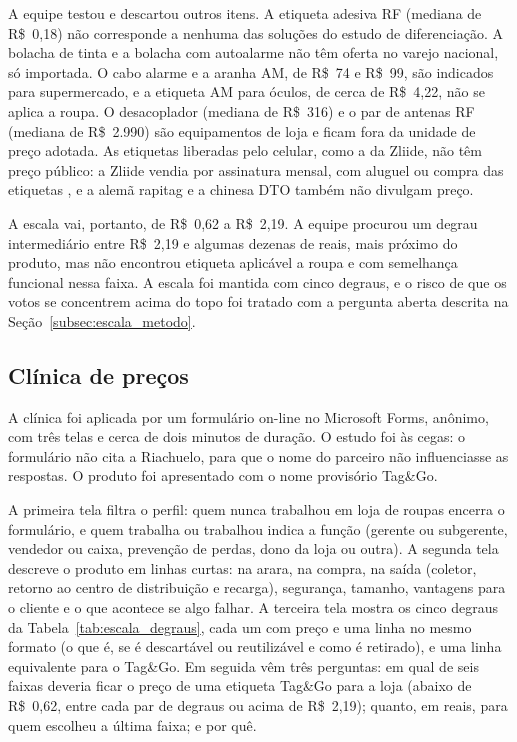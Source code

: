 A equipe testou e descartou outros itens. A etiqueta adesiva RF (mediana de R\$~0,18) não corresponde a nenhuma das soluções do estudo de diferenciação. A bolacha de tinta e a bolacha com autoalarme não têm oferta no varejo nacional, só importada. O cabo alarme e a aranha AM, de R\$~74 e R\$~99, são indicados para supermercado, e a etiqueta AM para óculos, de cerca de R\$~4,22, não se aplica a roupa. O desacoplador (mediana de R\$~316) e o par de antenas RF (mediana de R\$~2.990) são equipamentos de loja e ficam fora da unidade de preço adotada. As etiquetas liberadas pelo celular, como a da Zliide, não têm preço público: a Zliide vendia por assinatura mensal, com aluguel ou compra das etiquetas \cite{swedberg2021}, e a alemã rapitag e a chinesa DTO também não divulgam preço.

A escala vai, portanto, de R\$~0,62 a R\$~2,19. A equipe procurou um degrau intermediário entre R\$~2,19 e algumas dezenas de reais, mais próximo do produto, mas não encontrou etiqueta aplicável a roupa e com semelhança funcional nessa faixa. A escala foi mantida com cinco degraus, e o risco de que os votos se concentrem acima do topo foi tratado com a pergunta aberta descrita na Seção~\ref{subsec:escala_metodo}.

\subsection{Clínica de preços}
\label{subsec:escala_clinica}

A clínica foi aplicada por um formulário on-line no Microsoft Forms, anônimo, com três telas e cerca de dois minutos de duração. O estudo foi às cegas: o formulário não cita a Riachuelo, para que o nome do parceiro não influenciasse as respostas. O produto foi apresentado com o nome provisório Tag\&Go.

A primeira tela filtra o perfil: quem nunca trabalhou em loja de roupas encerra o formulário, e quem trabalha ou trabalhou indica a função (gerente ou subgerente, vendedor ou caixa, prevenção de perdas, dono da loja ou outra). A segunda tela descreve o produto em linhas curtas: na arara, na compra, na saída (coletor, retorno ao centro de distribuição e recarga), segurança, tamanho, vantagens para o cliente e o que acontece se algo falhar. A terceira tela mostra os cinco degraus da Tabela~\ref{tab:escala_degraus}, cada um com preço e uma linha no mesmo formato (o que é, se é descartável ou reutilizável e como é retirado), e uma linha equivalente para o Tag\&Go. Em seguida vêm três perguntas: em qual de seis faixas deveria ficar o preço de uma etiqueta Tag\&Go para a loja (abaixo de R\$~0,62, entre cada par de degraus ou acima de R\$~2,19); quanto, em reais, para quem escolheu a última faixa; e por quê.

